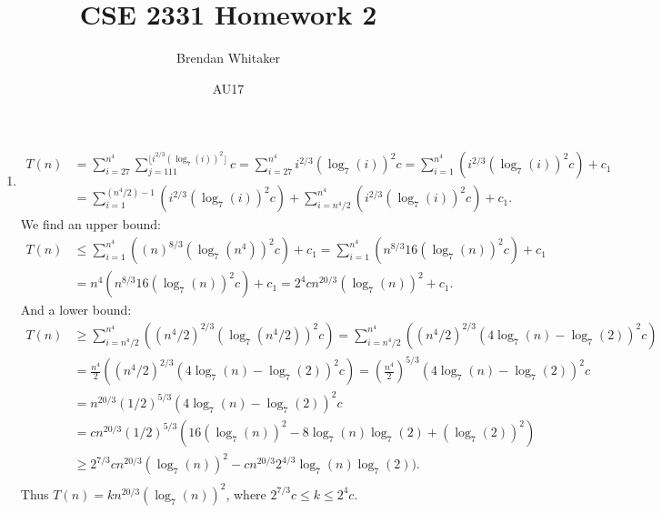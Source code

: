 \documentclass[10pt,oneside,reqno]{amsart}
\theoremstyle{plain}
\theoremstyle{definition}
\begin{document}
\title{CSE 2331 Homework 2}

\date{AU17}

\author[Brendan Whitaker]{Brendan Whitaker}

\maketitle

\begin{enumerate}[label=\arabic*.]

\item 
\begin{equation}
\begin{aligned}
T(n) &= \sum_{i = 27}^{n^4} \sum_{j = 111}^{\lfloor i^{2/3}(\log_7(i))^2\rfloor} c = \sum_{i = 27}^{n^4} i^{2/3}(\log_7(i))^2c = \sum_{i = 1}^{n^4}\left( i^{2/3}(\log_7(i))^2c \right) + c_1\\
&= \sum_{i = 1}^{(n^4/2) - 1}\left( i^{2/3}(\log_7(i))^2c \right) + \sum_{i = n^4/2}^{n^4}\left( i^{2/3}(\log_7(i))^2c \right) + c_1. 
\end{aligned}
\end{equation}
We find an upper bound:
\begin{equation}
\begin{aligned}
T(n) &\leq \sum_{i = 1}^{n^4}\left( (n)^{8/3}(\log_7(n^4))^2c \right) + c_1 = \sum_{i = 1}^{n^4}\left( n^{8/3}16(\log_7(n))^2c \right) + c_1\\
&= n^4\left( n^{8/3}16(\log_7(n))^2c \right) + c_1 = \boxed{2^4c n^{20/3}(\log_7(n))^2} + c_1. 
\end{aligned}
\end{equation}
And a lower bound:
\begin{equation}
\begin{aligned}
T(n) & \geq \sum_{i = n^4/2}^{n^4}\left( (n^4/2)^{2/3}(\log_7(n^4/2))^2c \right) = \sum_{i = n^4/2}^{n^4}\left( (n^4/2)^{2/3}(4\log_7(n) - \log_7(2))^2c \right)\\
&= \frac{n^4}{2}\left( (n^4/2)^{2/3}(4\log_7(n) - \log_7(2))^2c \right) =  \left(\frac{n^4}{2}\right)^{5/3}(4\log_7(n) - \log_7(2))^2c \\
&= n^{20/3}\left(1/2\right)^{5/3}(4\log_7(n) - \log_7(2))^2c  \\
&= cn^{20/3}\left(1/2\right)^{5/3}(16(\log_7(n))^2 - 8\log_7(n)\log_7(2) + (\log_7(2))^2)\\
& \geq \boxed{2^{7/3}cn^{20/3}(\log_7(n))^2} - cn^{20/3}2^{4/3}\log_7(n)\log_7(2)). \\
\end{aligned}
\end{equation}
Thus $T(n) = kn^{20/3}(\log_7(n))^2$, where $2^{7/3}c \leq k \leq 2^4c$. \\


\end{enumerate}
\end{document}
